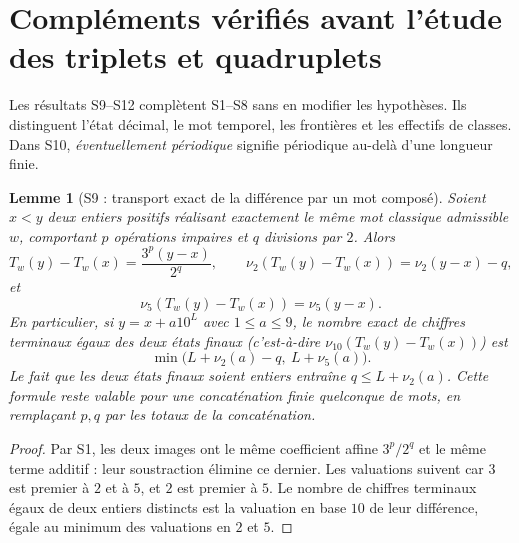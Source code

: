 \documentclass[11pt,a4paper]{article}
\newtheorem{lemma}{Lemme}
\begin{document}
\section*{Compléments vérifiés avant l'étude des triplets et quadruplets}
Les résultats S9--S12 complètent S1--S8 sans en modifier les hypothèses. Ils distinguent l'état décimal, le mot temporel, les frontières et les effectifs de classes. Dans S10, \emph{éventuellement périodique} signifie périodique au-delà d'une longueur finie.

\begin{lemma}[S9 : transport exact de la différence par un mot composé]
Soient $x<y$ deux entiers positifs réalisant exactement le même mot classique admissible $w$, comportant $p$ opérations impaires et $q$ divisions par $2$. Alors
\[
T_w(y)-T_w(x)=\frac{3^p(y-x)}{2^q},\qquad
\nu_2(T_w(y)-T_w(x))=\nu_2(y-x)-q,
\]
et
\[
\nu_5(T_w(y)-T_w(x))=\nu_5(y-x).
\]
En particulier, si $y=x+a10^L$ avec $1\le a\le9$, le nombre exact de chiffres terminaux égaux des deux états finaux (c'est-à-dire $\nu_{10}(T_w(y)-T_w(x))$) est
\[
\boxed{\min\bigl(L+\nu_2(a)-q,\ L+\nu_5(a)\bigr).}
\]
Le fait que les deux états finaux soient entiers entraîne $q\le L+\nu_2(a)$. Cette formule reste valable pour une concaténation finie quelconque de mots, en remplaçant $p,q$ par les totaux de la concaténation.
\end{lemma}
\begin{proof}Par S1, les deux images ont le même coefficient affine $3^p/2^q$ et le même terme additif : leur soustraction élimine ce dernier. Les valuations suivent car $3$ est premier à $2$ et à $5$, et $2$ est premier à $5$. Le nombre de chiffres terminaux égaux de deux entiers distincts est la valuation en base $10$ de leur différence, égale au minimum des valuations en $2$ et $5$.\end{proof}
\end{document}
